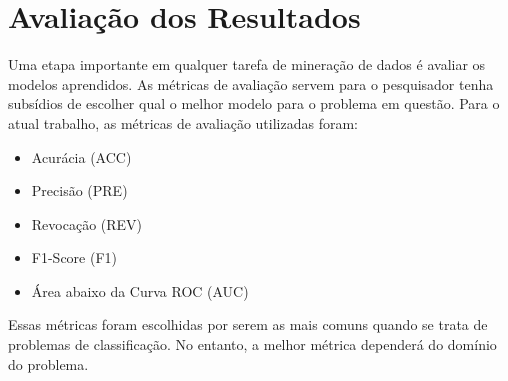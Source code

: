 \section{Avaliação dos Resultados}
\label{sec:metricas_avaliacao}
Uma etapa importante em qualquer tarefa de mineração de dados é avaliar os modelos aprendidos. As métricas de avaliação servem para o pesquisador tenha subsídios de escolher qual o melhor modelo para o problema em questão. Para o atual trabalho, as métricas de avaliação utilizadas foram:
\begin{itemize}
  \item Acurácia (ACC)
  \item Precisão (PRE)
  \item Revocação (REV)
  \item F1-Score (F1)
  \item Área abaixo da Curva ROC (AUC)
\end{itemize}

Essas métricas foram escolhidas por serem as mais comuns quando se trata de problemas de classificação. No entanto, a melhor métrica dependerá do domínio do problema.